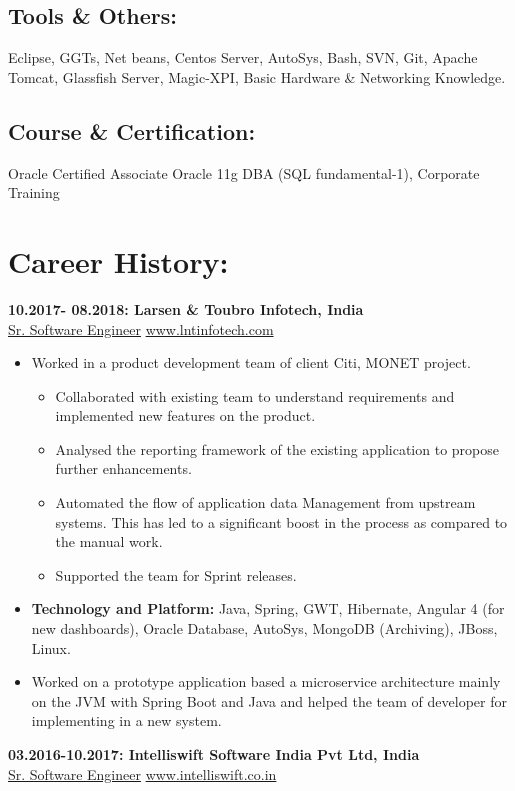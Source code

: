 \documentclass{article}
\begin{document}
\subsection{Tools \& Others:} Eclipse, GGTs, Net beans, Centos Server, AutoSys, Bash, SVN, Git, Apache Tomcat, Glassfish Server, Magic-XPI, Basic Hardware \& Networking Knowledge.
\subsection{Course \& Certification:}
Oracle Certified Associate Oracle 11g DBA (SQL fundamental-1), Corporate Training

\section{Career History:}
\textbf{10.2017- 08.2018: \hfill Larsen \& Toubro Infotech, India \\}
\underline{Sr. Software Engineer} \hfill \href{www.lntinfotech.com}{www.lntinfotech.com}
\begin{itemize}
	\itemsep0em
	\item Worked in a product development team of client Citi, MONET project.
	\begin{itemize}
		\itemsep0em
		\item Collaborated with existing team to understand requirements and implemented new features on the product.
		\item Analysed the reporting framework of the existing application to propose further enhancements.
		\item Automated the flow of application data Management from upstream systems. This has led to a significant boost in the process as compared to the manual work.
		\item Supported the team for Sprint releases.
	\end{itemize}
	\item \textbf{Technology and Platform:} Java, Spring, GWT, Hibernate, Angular 4 (for new dashboards), Oracle Database, AutoSys, MongoDB (Archiving), JBoss, Linux.
	\item Worked on a prototype application based a microservice architecture mainly on the JVM with Spring Boot and Java and helped the team of developer for implementing in a new system.

\end{itemize}
\textbf{03.2016-10.2017: \hfill Intelliswift Software India Pvt Ltd, India\\}
\underline{Sr. Software Engineer} \hfill \href{www.intelliswift.co.in}{www.intelliswift.co.in}
\end{document}
